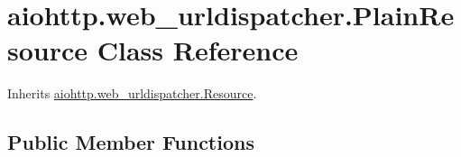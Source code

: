 \hypertarget{classaiohttp_1_1web__urldispatcher_1_1_plain_resource}{}\section{aiohttp.\+web\+\_\+urldispatcher.\+Plain\+Resource Class Reference}
\label{classaiohttp_1_1web__urldispatcher_1_1_plain_resource}


Inherits \hyperlink{classaiohttp_1_1web__urldispatcher_1_1_resource}{aiohttp.\+web\+\_\+urldispatcher.\+Resource}.

\subsection*{Public Member Functions}

